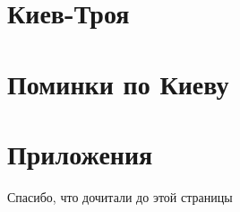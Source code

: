 \documentclass[a5paper,10pt,openany]{book}
\begin{document}
\part{Киев-Троя}











%


\part{Поминки по Киеву}







\backmatter


\part*{Приложения}



%

%
%
%
%
%


\begin{thebibliography}{999}

\end{thebibliography}




\newpage

\pagestyle{empty}

\clearpage
{}
\begin{center}
\begin{minipage}{\textwidth}
\begin{center}Спасибо, что дочитали до этой страницы\end{center}
\end{minipage}
\end{center}
\clearpage
\end{document}
